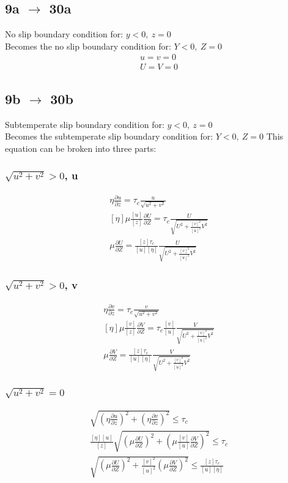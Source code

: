 \documentclass[10pt, letterpaper, twoside]{article}
\newcommand{\pd}[2]{\frac{\partial#1}{\partial#2}}
\begin{document}
	\subsection{9a $ \rightarrow $ 30a}
	No slip boundary condition for: $ y < 0,\ z = 0 $\\
	Becomes the no slip boundary condition for: $ Y < 0,\ Z = 0 $
	\begin{gather*}
		u = v = 0 \tag{9a} \\
		U = V = 0 \tag{30a}
	\end{gather*}
	\subsection{9b $ \rightarrow $ 30b}
	Subtemperate slip boundary condition for: $ y < 0,\ z = 0 $\\
	Becomes the subtemperate slip boundary condition for: $ Y < 0,\ Z = 0 $
	This equation can be broken into three parts:
	\subsubsection{$ \sqrt{u^2+v^2}>0 $, u}
	\begin{gather*}
		\eta\pd{u}{z} = \tau_c\frac{u}{\sqrt{u^2+v^2}} \tag{9b,I} \\
		\left[\eta\right]\mu\frac{\left[u\right]}{\left[z\right]}\pd{U}{Z} = \tau_c\frac{U}{\sqrt{U^2+\frac{\left[v\right]^2}{\left[u\right]^2}V^2}}\\
		\mu\pd{U}{Z} = \frac{\left[z\right]\tau_c}{\left[u\right]\left[\eta\right]}\frac{U}{\sqrt{U^2+\frac{\left[v\right]^2}{\left[u\right]^2}V^2}} \tag{9b',I}
	\end{gather*}
	\subsubsection{$ \sqrt{u^2+v^2}>0 $, v}
	\begin{gather*}
		\eta\pd{v}{z} = \tau_c\frac{v}{\sqrt{u^2+v^2}} \tag{9b,II} \\
		\left[\eta\right]\mu\frac{\left[v\right]}{\left[z\right]}\pd{V}{Z} = \tau_c\frac{\left[v\right]}{\left[u\right]}\frac{V}{\sqrt{U^2+\frac{\left[v\right]^2}{\left[u\right]^2}V^2}}\\
		\mu\pd{V}{Z} = \frac{\left[z\right]\tau_c}{\left[u\right]\left[\eta\right]}\frac{V}{\sqrt{U^2+\frac{\left[v\right]^2}{\left[u\right]^2}V^2}} \tag{9b',II}
	\end{gather*}
	\subsubsection{$ \sqrt{u^2+v^2}=0 $}
	\begin{gather*}
		\sqrt{\left(\eta\pd{u}{z}\right)^2 + \left(\eta\pd{v}{z}\right)^2}\leq\tau_c \tag{9b,III} \\
		\frac{\left[\eta\right]\left[u\right]}{\left[z\right]}\sqrt{\left(\mu\pd{U}{Z}\right)^2+\left(\mu\frac{\left[v\right]}{\left[u\right]}\pd{V}{Z}\right)^2}\leq\tau_c\\
		\sqrt{\left(\mu\pd{U}{Z}\right)^2+\frac{\left[v\right]^2}{\left[u\right]^2}\left(\mu\pd{V}{Z}\right)^2}\leq\frac{\left[z\right]\tau_c}{\left[u\right]\left[\eta\right]} \tag{9b',III}
	\end{gather*}
\end{document}
